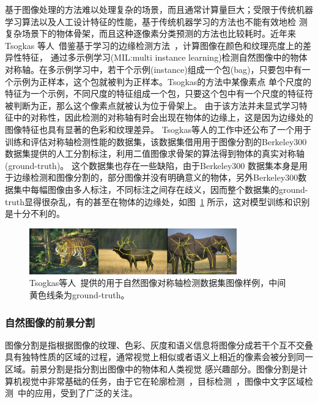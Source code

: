 \documentclass[UTF8]{ctexart}
\numberwithin{equation}{section} %
\numberwithin{table}{section} %
\begin{document}
基于图像处理的方法难以处理复杂的场景，而且通常计算量巨大；受限于传统机器学习算法以及人工设计特征的性能，基于传统机器学习的方法也不能有效地检
测复杂场景下的物体骨架，而且这种逐像素分类预测的方法也比较耗时。近年来 Tsogkas 等人~\cite{tsogkas2012learning}借鉴基于学习的边缘检测方法~\cite{martin2004learning}，计算图像在颜色和纹理亮度上的差异性特征，
通过多示例学习(MIL:multi instance learning)检测自然图像中的物体对称轴。在多示例学习中，若干个示例(instance)组成一个包(bag)，只要包中有一个示例为正样本，这个包就被判为正样本。Tsogkas的方法中某像素点
单个尺度的特征为一个示例，不同尺度的特征组成一个包，只要这个包中有一个尺度的特征符被判断为正，那么这个像素点就被认为位于骨架上。
由于该方法并未显式学习特征中的对称性，因此检测的对称轴有时会出现在物体的边缘上，这是因为边缘处的图像特征也具有显著的色彩和纹理差异。
Tsogkas等人的工作中还公布了一个用于训练和评估对称轴检测性能的数据集，该数据集借用用于图像分割的Berkeley300数据集提供的人工分割标注，利用二值图像求骨架的算法得到物体的真实对称轴(ground-truth)。
这个数据集也存在一些缺陷，由于Berkeley300 数据集本身是用于边缘检测和图像分割的，部分图像并没有明确意义的物体，另外Berkeley300数据集中每幅图像由多人标注，不同标注之间存在歧义，因而整个数据集的ground-truth显得很杂乱，有的甚至在物体的边缘处，如图~\ref{fig:sym300} 所示，这对模型训练和识别是十分不利的。
\begin{figure}[htbp]
  \centering
  \includegraphics[width=0.8\textwidth]{figures/sym300.png}
  \caption{Tsogkas等人~\cite{tsogkas2012learning}提供的用于自然图像对称轴检测数据集图像样例，中间黄色线条为ground-truth。}\label{fig:sym300}
\end{figure}

\subsubsection{自然图像的前景分割}
图像分割是指根据图像的纹理、色彩、灰度和语义信息将图像分成若干个互不交叠具有独特性质的区域的过程，通常视觉上相似或者语义上相近的像素会被分到同一区域。前景分割是指分割出图像中的物体和人类视觉
感兴趣部分。图像分割是计算机视觉中非常基础的任务，由于它在轮廓检测~\cite{arbelaez2011contour}，目标检测~\cite{leibe2008robust}，图像中文字区域检测~\cite{chen2004text}中的应用，受到了广泛的关注。
\end{document}
